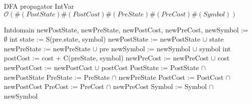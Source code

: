 \begin{algorithm}[H]
\label{fig:algint}
\caption{DFA propagator IntVar\newline
 $\mathcal{O}(\#(PostState)\#(PostCost)\#(PreState)\#(PreCost)\#(Symbol))$}
\begin{algorithmic}[1]
\State Intdomain newPostState, newPreState, newPostCost, newPreCost, newSymbol := $\emptyset$
		\State int state := S(pre.state, symbol)
					\State newPostState := newPostState $\cup$ state
			\State newPreState := newPreState $\cup$ pre
			\State newSymbol := newSymbol $\cup$ symbol 
				\State int postCost := cost + C(preState, symbol)
					\State newPreCost := newPreCost $\cup$ cost
					\State newPostCost := newPostCost $\cup$ postCost
				\EndIf
			\EndFor
		\EndIf
	\EndFor
\EndFor
\State PostState := PostState $\cap$ newPostState
\State PreState := PreState $\cap$ newPreState
\State PostCost := PostCost $\cap$ newPostCost
\State PreCost := PreCost $\cap$ newPreCost
\State Symbol := Symbol $\cap$ newSymbol
\EndProcedure
\end{algorithmic}
\end{algorithm} 

